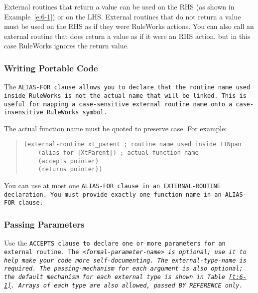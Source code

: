 External routines that return a value can be used on the RHS (as shown
in Example~\ref{e:6-1}) or on the LHS. External routines that do not return a
value must be used on the RHS as if they were RuleWorks actions. You
can also call an external routine that does return a value as if it
were an RHS action, but in this case RuleWorks ignores the return
value.

\subsubsection{Writing Portable Code}

The \tt{ALIAS-FOR} clause allows you to declare that the routine name
used inside RuleWorks is not the actual name that will be linked. This
is useful for mapping a case-sensitive external routine name onto a
case-insensitive RuleWorks symbol.

The actual function name must be quoted to preserve case. For example:

\begin{quote}
\begin{verbatim}
(external-routine xt_parent ; routine name used inside TINpan
    (alias-for |XtParent|) ; actual function name
    (accepts pointer)
    (returns pointer))
\end{verbatim}
\end{quote}

You can use at most one \tt{ALIAS-FOR} clause in an \tt{EXTERNAL-ROUTINE}
declaration. You must provide exactly one function name in an
\tt{ALIAS-FOR} clause.

\subsubsection{Passing Parameters}

Use the \tt{ACCEPTS} clause to declare one or more parameters for an
external routine. The \verb|<|\it{formal-parameter-name}\verb|>| is
optional; use it to help make your code more self-documenting. The
external-type-name is required. The passing-mechanism for each
argument is also optional; the default mechanism for each external
type is shown in Table~\ref{t:6-1}. Arrays of each type are also
allowed, passed \tt{BY REFERENCE} only.

